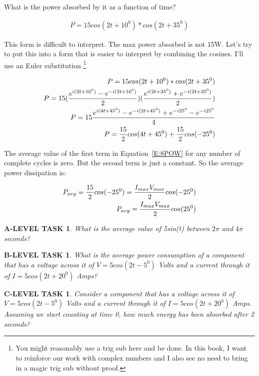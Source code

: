 \documentclass{book}
\numberwithin{equation}{section}
\newtheorem{alevel}{A-LEVEL TASK}
\newtheorem{blevel}{B-LEVEL TASK}
\newtheorem{clevel}{C-LEVEL TASK}
\theoremstyle{definition}
\begin{document}
What is the power absorbed by it as a function of time?

\begin{align}
P=15cos(2t+10^0)*cos(2t+35^0)
\end{align}

This form is difficult to interpret. The max power absorbed is not 15W. Let's try to put this into a form that is easier to interpret by combining the cosines. I'll use an Euler substitution \footnote{You might reasonably use a trig sub here and be done. In this book, I want to reinforce our work with complex numbers and I also see no need to bring in a magic trig sub without proof.}

\begin{align}
P=15cos(2t+10^0)*cos(2t+35^0) \notag\\
P = 15(\frac{e^{i(2t+10^0)}-e^{-i(2t+10^0)}}{2})(\frac{e^{i(2t+35^0)}+e^{-i(2t+35^0)}}{2})\notag\\
P = 15\frac{e^{i(4t+45^0)}-e^{-i(2t+45^0)}+e^{-i25^0}-e^{-i25^0}}{4}\notag\\
P = \frac{15}{2}cos(4t+45^0)+\frac{15}{2}cos(-25^0) \label{E:8POW}
\end{align}

The average value of the first term in Equation~\eqref{E:8POW} for any number of complete cycles is zero. But the second term is just a constant. So the average power dissipation is:

\begin{align}
P_{avg} = \frac{15}{2}cos(-25^0)=\frac{I_{max}V_{max}}{2}cos(-25^0) \notag\\
P_{avg}=\frac{I_{max}V_{max}}{2}cos(25^0)
\end{align}

\begin{alevel}
What is the average value of 5sin(t) between $2\pi$ and $4\pi$ seconds?
\end{alevel}

\begin{blevel}
What is the average power consumption of a component that has a voltage across it of $V=5cos(2t-5^0)$ Volts  and a current through it of $I=5cos(2t+20^0)$ Amps?
\end{blevel}

\begin{clevel}
Consider a component that has a voltage across it of $V=5cos(2t-5^0)$ Volts  and a current through it of $I=5cos(2t+20^0)$ Amps. Assuming we start counting at time 0, how much energy has been absorbed after 2 seconds?
\end{clevel}
\end{document}
